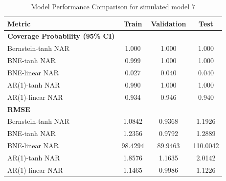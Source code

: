 \documentclass{article}
\begin{document}
\begin{table}[htbp]
\centering
\caption{Model Performance Comparison for simulated model 7}
\label{tab:model7_comparison}
\begin{tabular}{lccc}
\toprule
\textbf{Metric} & \textbf{Train} & \textbf{Validation} & \textbf{Test} \\
\midrule
\textbf{Coverage Probability (95\% CI)} & & & \\
Bernstein-tanh NAR & 1.000 & 1.000 & 1.000 \\
BNE-tanh NAR & 0.999 & 1.000 & 1.000 \\
BNE-linear NAR & 0.027 & 0.040 & 0.040 \\
AR(1)-tanh NAR & 0.990 & 1.000 & 1.000 \\
AR(1)-linear NAR & 0.934 & 0.946 & 0.940 \\
\midrule
\textbf{RMSE} & & & \\
Bernstein-tanh NAR & 1.0842 & 0.9368 & 1.1926 \\
BNE-tanh NAR & 1.2356 & 0.9792 & 1.2889 \\
BNE-linear NAR & 98.4294 & 89.9463 & 110.0042 \\
AR(1)-tanh NAR & 1.8576 & 1.1635 & 2.0142 \\
AR(1)-linear NAR & 1.1465 & 0.9986 & 1.1226 \\
\bottomrule
\end{tabular}
\end{table}

\newpage
\printbibliography
\end{document}
